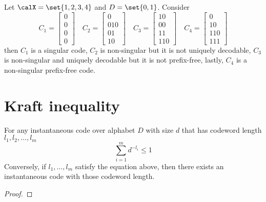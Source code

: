\begin{example}
    Let \(\calX = \set{1,2,3,4}\) and \(D = \set{0,1}\). Consider
    \begin{equation*}
        C_1 = \begin{bmatrix}
            0\\
            0\\
            0\\
            0
        \end{bmatrix} \quad C_2 = \begin{bmatrix}
            0\\
            010\\
            01\\
            10
        \end{bmatrix} \quad C_3 = \begin{bmatrix}
            10\\
            00\\
            11\\
            110
        \end{bmatrix} \quad C_4 = \begin{bmatrix}
            0\\
            10\\
            110\\
            111
        \end{bmatrix}
    \end{equation*}
    then \(C_1\) is a singular code, \(C_2\) is non-singular but it is not uniquely decodable, \(C_3\) is non-singular and uniquely decodable but it is not prefix-free, lastly, \(C_4\) is a non-singular prefix-free code. 
\end{example}

\section{Kraft inequality}
\begin{theorem}
    For any instantaneous code over alphabet \(D\) with size \(d\) that has codeword length \(l_1 , l_2 , \dots , l_m\)
    \begin{equation*}
        \sum_{i = 1}^m d^{-l_i} \leq 1
    \end{equation*}
    Conversely, if \(l_1, \dots ,l_m\) satisfy the equation above, then there exists an instantaneous code with those codeword length.
\end{theorem}

\begin{proof}
    
\end{proof}

